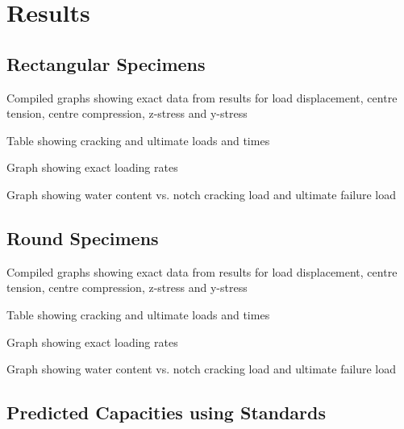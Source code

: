 \documentclass[11pt,a4paper]{article}
\numberwithin{equation}{subsection}
\begin{document}
\pagebreak

\section{Results}

\subsection{Rectangular Specimens}
\vspace*{\baselineskip}
\noindent Compiled graphs showing exact data from results for load displacement, centre tension, centre compression, z-stress and y-stress \par

\vspace*{\baselineskip}
\noindent Table showing cracking and ultimate loads and times \par

\vspace*{\baselineskip}
\noindent Graph showing exact loading rates \par

\vspace*{\baselineskip}
\noindent Graph showing water content vs. notch cracking load and ultimate failure load \par

\subsection{Round Specimens}
\vspace*{\baselineskip}
\noindent Compiled graphs showing exact data from results for load displacement, centre tension, centre compression, z-stress and y-stress \par

\vspace*{\baselineskip}
\noindent Table showing cracking and ultimate loads and times \par

\vspace*{\baselineskip}
\noindent Graph showing exact loading rates \par

\vspace*{\baselineskip}
\noindent Graph showing water content vs. notch cracking load and ultimate failure load \par

\subsection{Predicted Capacities using Standards}
\end{document}
